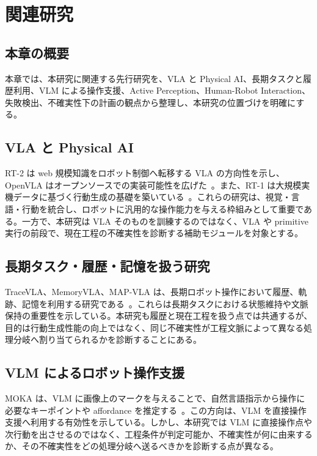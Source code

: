 \chapter{関連研究}

\section{本章の概要}

本章では、本研究に関連する先行研究を、VLA と Physical AI、長期タスクと履歴利用、VLM による操作支援、Active Perception、Human-Robot Interaction、失敗検出、不確実性下の計画の観点から整理し、本研究の位置づけを明確にする。

\section{VLA と Physical AI}

RT-2 は web 規模知識をロボット制御へ転移する VLA の方向性を示し、OpenVLA はオープンソースでの実装可能性を広げた~\cite{rt2, openvla}。また、RT-1 は大規模実機データに基づく行動生成の基礎を築いている~\cite{rt1}。これらの研究は、視覚・言語・行動を統合し、ロボットに汎用的な操作能力を与える枠組みとして重要である。一方で、本研究は VLA そのものを訓練するのではなく、VLA や primitive 実行の前段で、現在工程の不確実性を診断する補助モジュールを対象とする。

\section{長期タスク・履歴・記憶を扱う研究}

TraceVLA、MemoryVLA、MAP-VLA は、長期ロボット操作において履歴、軌跡、記憶を利用する研究である~\cite{tracevla, memoryvla, mapvla}。これらは長期タスクにおける状態維持や文脈保持の重要性を示している。本研究も履歴と現在工程を扱う点では共通するが、目的は行動生成性能の向上ではなく、同じ不確実性が工程文脈によって異なる処理分岐へ割り当てられるかを診断することにある。

\section{VLM によるロボット操作支援}

MOKA は、VLM に画像上のマークを与えることで、自然言語指示から操作に必要なキーポイントや affordance を推定する~\cite{moka}。この方向は、VLM を直接操作支援へ利用する有効性を示している。しかし、本研究では VLM に直接操作点や次行動を出させるのではなく、工程条件が判定可能か、不確実性が何に由来するか、その不確実性をどの処理分岐へ送るべきかを診断する点が異なる。

